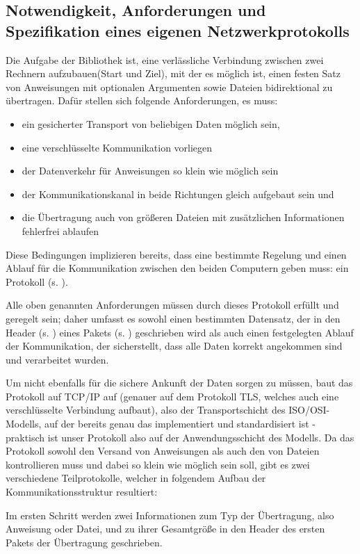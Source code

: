 \subsection{Notwendigkeit, Anforderungen und Spezifikation eines eigenen Netzwerkprotokolls}
Die Aufgabe der Bibliothek ist, eine verlässliche Verbindung zwischen zwei Rechnern aufzubauen(Start und Ziel), mit der es möglich ist, einen festen Satz von Anweisungen mit optionalen Argumenten sowie Dateien bidirektional zu übertragen.
Dafür stellen sich folgende Anforderungen, es muss:
\begin{itemize}
\item ein gesicherter Transport von beliebigen Daten möglich sein,
\item eine verschlüsselte Kommunikation vorliegen
\item der Datenverkehr für Anweisungen so klein wie möglich sein
\item der Kommunikationskanal in beide Richtungen gleich aufgebaut sein und
\item die Übertragung auch von größeren Dateien mit zusätzlichen Informationen fehlerfrei ablaufen
\end{itemize}
Diese Bedingungen implizieren bereits, dass eine bestimmte Regelung und einen Ablauf für die Kommunikation zwischen den beiden Computern geben muss: ein Protokoll (s. ).\par
Alle oben genannten Anforderungen müssen durch dieses Protokoll erfüllt und geregelt sein; daher umfasst es sowohl einen bestimmten Datensatz, der in den Header (s. ) eines Pakets (s. ) geschrieben wird als auch einen festgelegten Ablauf der Kommunikation, der sicherstellt, dass alle Daten korrekt angekommen sind und verarbeitet wurden.\par 
Um nicht ebenfalls für die sichere Ankunft der Daten sorgen zu müssen, baut das Protokoll auf TCP/IP auf (genauer auf dem Protokoll TLS, welches auch eine verschlüsselte Verbindung aufbaut), also der Transportschicht des ISO/OSI-Modells, auf der bereits genau das implementiert und standardisiert ist - praktisch ist unser Protokoll also auf der Anwendungsschicht des Modells.
Da das Protokoll sowohl den Versand von Anweisungen als auch den von Dateien kontrollieren muss und dabei so klein wie möglich sein soll, gibt es zwei verschiedene Teilprotokolle, welcher in folgendem Aufbau der Kommunikationsstruktur resultiert:\par
Im ersten Schritt werden zwei Informationen zum Typ der Übertragung, also Anweisung oder Datei, und zu ihrer Gesamtgröße in den Header des ersten Pakets der Übertragung geschrieben.
